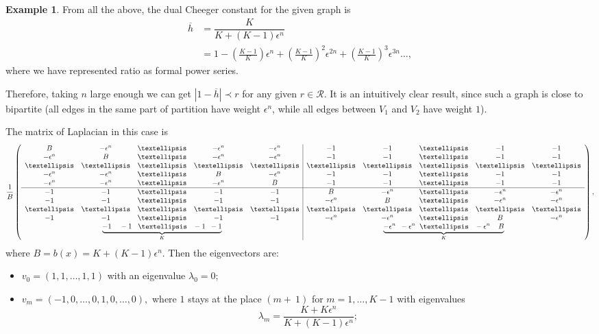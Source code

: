 \documentclass[a4paper,12pt]{amsart}
\theoremstyle{definition}
\newtheorem{example}{Example}
\begin{document}
\begin{example}
From all the above, the dual Cheeger constant for the given graph is
\begin{align*}
\overline h&=\dfrac{K}{K+(K-1)\epsilon^n}\\
&=1-\left(\frac{K-1}{K}\right)\epsilon^n+\left(\frac{K-1}{K}\right)^2\epsilon^{2n}+\left(\frac{K-1}{K}\right)^3\epsilon^{3n} \dots,
\end{align*}
where we have represented ratio as formal power series.

Therefore, taking $n$ large enough we can get $|1-\overline h|\prec r$ for any given $r\in \mathcal R$. It is an intuitively clear result, since such a graph is close to bipartite (all edges in the same part of partition have weight $\epsilon^n$, while all edges between $V_1$ and $V_2$ have weight $1$).

The matrix of Laplacian in this case is 
$$
\frac{1}{B}
 \left(
    \begin{array}{ccccc|ccccc}
      B&-\epsilon^n&\dots&-\epsilon^n&-\epsilon^n& -1&-1&\dots&-1&-1\\
      -\epsilon^n&B&\dots&-\epsilon^n&-\epsilon^n& -1&-1&\dots&-1&-1\\
	\dots&\dots&\dots&\dots&\dots&\dots&\dots&\dots&\dots&\dots\\
    -\epsilon^n&-\epsilon^n&\dots&B&-\epsilon^n& -1&-1&\dots&-1&-1\\
   -\epsilon^n&-\epsilon^n&\dots&-\epsilon^n&B& -1&-1&\dots&-1&-1\\
      \hline
      -1&-1&\dots&-1&-1&B&-\epsilon^n&\dots&-\epsilon^n&-\epsilon^n\\
      -1&-1&\dots&-1&-1&-\epsilon^n&B&\dots&-\epsilon^n&-\epsilon^n\\
	\dots&\dots&\dots&\dots&\dots&\dots&\dots&\dots&\dots&\dots\\
      -1&-1&\dots&-1&-1&-\epsilon^n&-\epsilon^n&\dots&B&-\epsilon^n\\
      \multicolumn{5}{c|}{\underbrace{-1\;\;\;\;-1\;\;\;\dots\;\;\;-1\;\;-1}_{K}}&\multicolumn{5}{c}{\underbrace{-\epsilon^n\;\;-\epsilon^n\;\;\dots\;\;\;-\epsilon^n\;\;\;\;B}_{K}}\\
    \end{array}
    \right),
$$
where $B=b(x)={K+(K-1)\epsilon^n}$. Then the eigenvectors are:
\begin{itemize}
\item
$
v_0=(1,1,\dots,1,1)
$
with an eigenvalue $\lambda_0=0$;
\item
$
v_m=(-1,0,\dots, 0,1, 0,\dots, 0),$ where $1$ stays at the place $(m+~1)$ for $m=1,\dots,K-1$ with eigenvalues $$\lambda_m=\dfrac{K+K\epsilon^n}{K+(K-1)\epsilon^n};
$$
\end{itemize}
\end{example}
\end{document}
